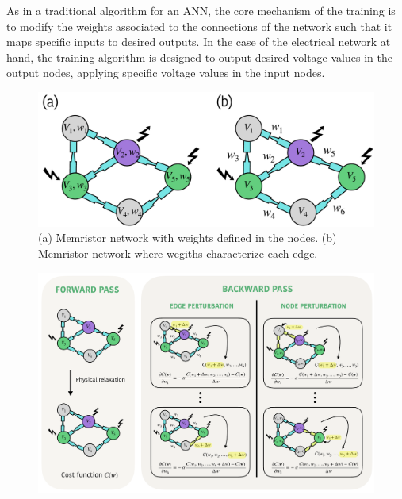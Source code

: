 \documentclass[reprint,superscriptaddress,prb,showkeys]{revtex4-2}
\begin{document}
As in a traditional algorithm for an ANN, the core mechanism of the training is to modify the weights associated to the connections of the network such that it maps specific inputs to desired outputs. In the case of the electrical network at hand, the training algorithm is designed to output desired voltage values in the output nodes, applying specific voltage values in the input nodes.
\begin{figure}[!h]
    \centering
    \includegraphics[width=0.8\columnwidth]{plots/training/two_types_weights.pdf}
    \caption{(a) Memristor network with weights defined in the nodes. (b) Memristor network where wegiths characterize each edge.}
    \label{fig:two_types_weights}
\end{figure} 
\begin{figure}[t] 
    \centering
    \includegraphics[width=\textwidth]{plots/training/training_scheme.pdf}
    \caption{}
    \label{fig:training_scheme}
\end{figure}
\end{document}
